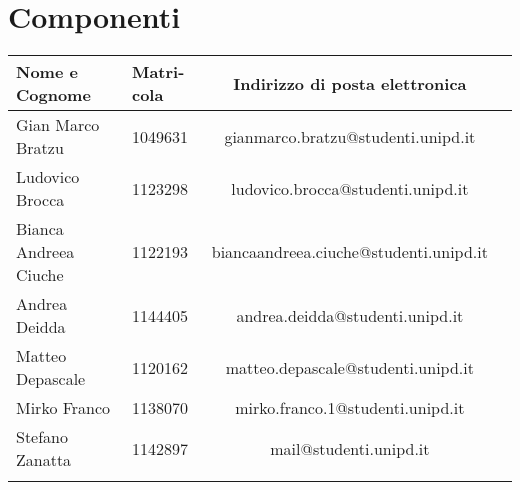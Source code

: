 \section{Componenti}
\label{componenti}
		\begin{tabularx}{\textwidth}{|X|X|c|X|}
			\hline
			\textbf{Nome e Cognome} &\textbf{Matri-}\newline \textbf{cola} & \textbf{Indirizzo di posta elettronica} \\
			\hline 
			Gian Marco Bratzu & 1049631 &gianmarco.bratzu@studenti.unipd.it \\
			\hline
			Ludovico Brocca & 1123298 & ludovico.brocca@studenti.unipd.it \\
			\hline
			Bianca Andreea Ciuche & 1122193 & biancaandreea.ciuche@studenti.unipd.it \\
			\hline
			Andrea Deidda & 1144405 & andrea.deidda@studenti.unipd.it \\
			\hline
			Matteo Depascale & 1120162 & matteo.depascale@studenti.unipd.it \\
			\hline
			Mirko Franco & 1138070 &  mirko.franco.1@studenti.unipd.it \\
			\hline
			Stefano Zanatta & 1142897 & mail@studenti.unipd.it \\
			\hline
			\caption{Componenti}
		\end{tabularx}
			

